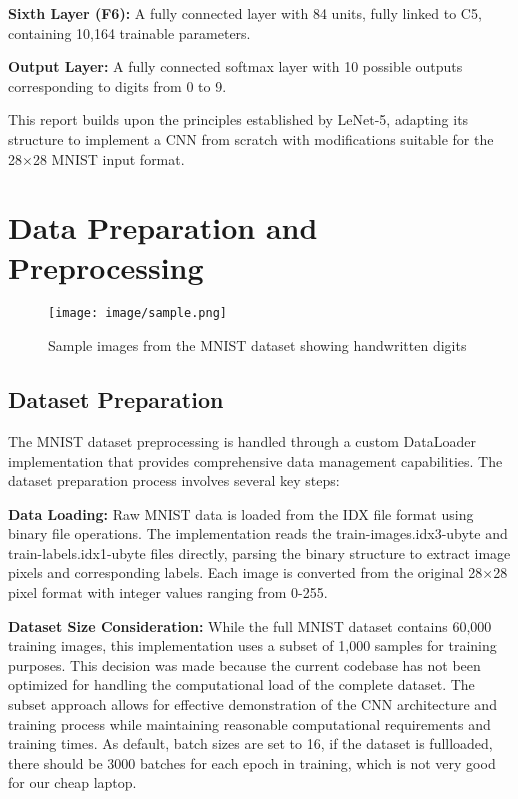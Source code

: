 \documentclass[conference]{IEEEtran}
\begin{document}
\textbf{Sixth Layer (F6):} A fully connected layer with 84 units, fully linked to C5, containing 10,164 trainable parameters.

\textbf{Output Layer:} A fully connected softmax layer with 10 possible outputs corresponding to digits from 0 to 9.

This report builds upon the principles established by LeNet-5, adapting its structure to implement a CNN from scratch with modifications suitable for the 28×28 MNIST input format.


\section{Data Preparation and Preprocessing}
\begin{figure}[htbp]
    \centering
    \texttt{[image: image/sample.png]}
    \caption{Sample images from the MNIST dataset showing handwritten digits}
    \label{fig:enter-label}
\end{figure}
\subsection{Dataset Preparation}

The MNIST dataset preprocessing is handled through a custom DataLoader implementation that provides comprehensive data management capabilities. The dataset preparation process involves several key steps:

\textbf{Data Loading:} Raw MNIST data is loaded from the IDX file format using binary file operations. The implementation reads the train-images.idx3-ubyte and train-labels.idx1-ubyte files directly, parsing the binary structure to extract image pixels and corresponding labels. Each image is converted from the original 28×28 pixel format with integer values ranging from 0-255.

\textbf{Dataset Size Consideration:} While the full MNIST dataset contains 60,000 training images, this implementation uses a subset of 1,000 samples for training purposes. This decision was made because the current codebase has not been optimized for handling the computational load of the complete dataset. The subset approach allows for effective demonstration of the CNN architecture and training process while maintaining reasonable computational requirements and training times. As default, batch sizes are set to 16, if the dataset is fullloaded, there should be 3000 batches for each epoch in training, which is not very good for our cheap laptop.
\end{document}
